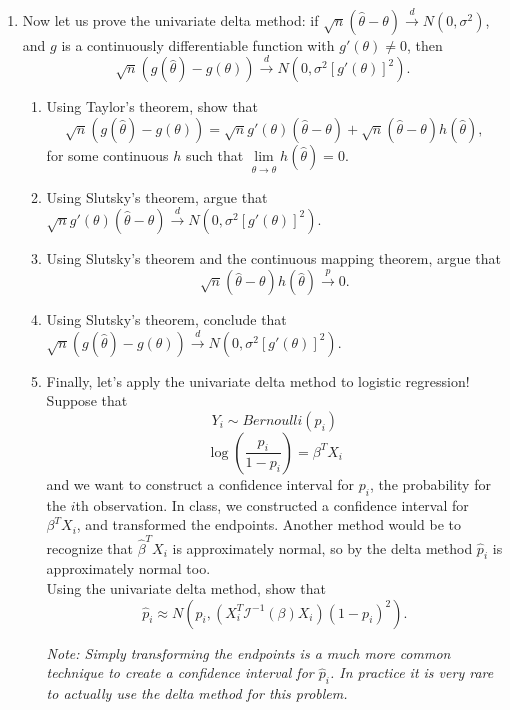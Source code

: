 \documentclass[11pt]{article}
\begin{document}
\begin{enumerate}
\item Now let us prove the univariate delta method: if $\sqrt{n}(\widehat{\theta} - \theta) \overset{d}{\to} N(0, \sigma^2)$, and $g$ is a continuously differentiable function with $g'(\theta) \neq 0$, then
$$\sqrt{n}(g(\widehat{\theta}) - g(\theta)) \overset{d}{\to} N(0, \sigma^2 [g'(\theta)]^2).$$

\begin{enumerate}
\item Using Taylor's theorem, show that
$$\sqrt{n}(g(\widehat{\theta}) - g(\theta)) = \sqrt{n}g'(\theta)(\widehat{\theta} - \theta) + \sqrt{n}(\widehat{\theta} - \theta) h(\widehat{\theta}),$$
for some continuous $h$ such that $\lim \limits_{\widehat{\theta} \to \theta} h(\widehat{\theta}) = 0$.

\item Using Slutsky's theorem, argue that $\sqrt{n} g'(\theta)(\widehat{\theta} - \theta) \overset{d}{\to} N(0, \sigma^2 [g'(\theta)]^2)$.

\item Using Slutsky's theorem and the continuous mapping theorem, argue that $$\sqrt{n}(\widehat{\theta} - \theta) h(\widehat{\theta}) \overset{p}{\to} 0.$$

\item Using Slutsky's theorem, conclude that $\sqrt{n}(g(\widehat{\theta}) - g(\theta)) \overset{d}{\to} N(0, \sigma^2 [g'(\theta)]^2)$.

\item Finally, let's apply the univariate delta method to logistic regression! Suppose that 
$$Y_i \sim Bernoulli(p_i)$$
$$\log \left( \dfrac{p_i}{1 - p_i} \right) = \beta^T X_i$$
and we want to construct a confidence interval for $p_i$, the probability for the $i$th observation. In class, we constructed a confidence interval for $\beta^T X_i$, and transformed the endpoints. Another method would be to recognize that $\widehat{\beta}^T X_i$ is approximately normal, so by the delta method $\widehat{p}_i$ is approximately normal too.\\

\noindent Using the univariate delta method, show that
$$\widehat{p}_i \approx N(p_i, (X_i^T \mathcal{I}^{-1}(\beta) X_i) (1 - p_i)^2).$$

\textit{Note: Simply transforming the endpoints is a much more common technique to create a confidence interval for $\widehat{p}_i$. In practice it is very rare to actually use the delta method for this problem.}
\end{enumerate}
\end{enumerate}
\end{document}
